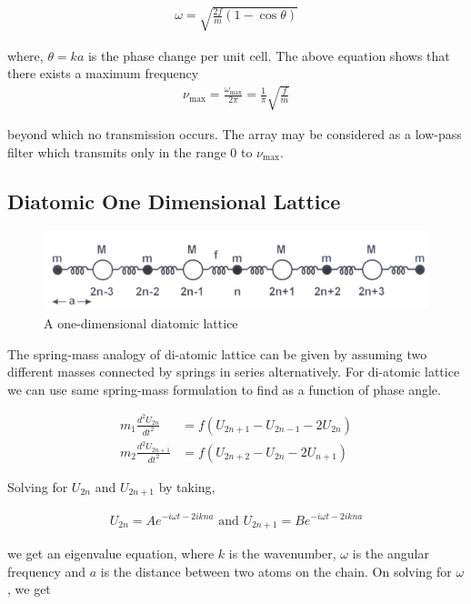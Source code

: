 \begin{align}
    \omega = \sqrt{\frac{2f}{m}(1-\cos \theta)}
\end{align}    

where, $\theta = ka$ is the phase change per unit cell. The above equation shows that there exists a maximum frequency
\begin{align}
    \nu_\text{max} = \frac{\omega_\text{max}}{2\pi} = \frac{1}{\pi}\sqrt{\frac{f}{m}}
\end{align}

beyond which no transmission occurs. The array may be considered as a low-pass filter which transmits only in the range $0$ to $\nu_\text{max}$.

\subsection{Diatomic One Dimensional Lattice}
\begin{figure}[H]
    \centering
    \includegraphics[width=1\columnwidth]{images/theory3.png}
    \caption{A one-dimensional diatomic lattice}
    \label{f2}
\end{figure}
The spring-mass analogy of di-atomic lattice can be given by assuming two different masses connected by springs in series alternatively. For di-atomic lattice we can use same spring-mass formulation to find as a function of phase angle.

\begin{align}
    m_1\frac{d^2U_{2n}}{dt^2} &= f(U_{2n+1}-U_{2n-1} - 2U_{2n})\\
    m_2\frac{d^2U_{2n+1}}{dt^2} &= f(U_{2n+2}-U_{2n} - 2U_{n+1})
\end{align}

Solving for $U_{2n}$ and $U_{2n+1}$ by taking,

\begin{align}
    U_{2n} = Ae^{-i\omega t-2ikna} \text{ and } U_{2n+1} = Be^{-i\omega t-2ikna}
\end{align}

we get an eigenvalue equation, where $k$ is the wavenumber, $\omega$ is the angular frequency and $a$ is the distance between two atoms on the chain. On solving for $\omega$, we get 

